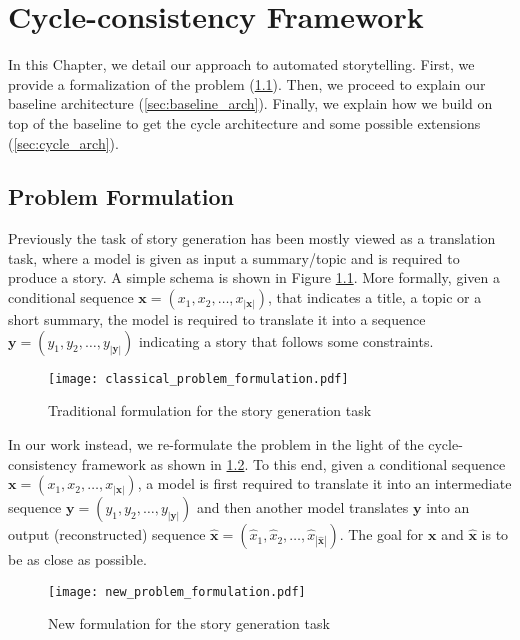 \chapter{Cycle-consistency Framework}
\label{ch:main_idea}


\graphicspath{ {./body/media/} }


In this Chapter, we detail our approach to automated storytelling. First, we provide a formalization of the problem (\cref{sec:formulation}). Then, we proceed to explain our baseline architecture (\cref{sec:baseline_arch}). Finally, we explain how we build on top of the baseline to get the cycle architecture and some possible extensions (\cref{sec:cycle_arch}).


\section{Problem Formulation}
\label{sec:formulation}

Previously the task of story generation has been mostly viewed as a translation task, where a model is given as input a summary/topic and is required to produce a story. A simple schema is shown in Figure \ref{fig:classical_problem_formulation}. More formally, given a conditional sequence $\mathbf{x} = (x_1, x_2, \ldots, x_{|\mathbf{x}|})$, that indicates a title, a topic or a short summary, the model is required to translate it into a sequence $\mathbf{y} = (y_1, y_2, \ldots, y_{|\mathbf{y}|})$ indicating a story that follows some constraints.

\begin{figure}[ht]
\centering
\texttt{[image: classical\_problem\_formulation.pdf]}
\caption{Traditional formulation for the story generation task}
\label{fig:classical_problem_formulation}
\end{figure}

In our work instead, we re-formulate the problem in the light of the cycle-consistency framework as shown in \cref{fig:new_problem_formulation}. To this end, given a conditional sequence $\mathbf{x} = (x_1, x_2, \ldots, x_{|\mathbf{x}|})$, a model is first required to translate it into an intermediate sequence $\mathbf{y} = (y_1, y_2, \ldots, y_{|\mathbf{y}|})$ and then another model translates $\mathbf{y}$ into an output (reconstructed) sequence $\hat{\mathbf{x}} = (\hat{x}_1, \hat{x}_2, \ldots, \hat{x}_{|\mathbf{\hat{\mathbf{x}}}|})$. The goal for $\mathbf{x}$ and $\hat{\mathbf{x}}$ is to be as close as possible.

\begin{figure}[ht]
\centering
\texttt{[image: new\_problem\_formulation.pdf]}
\caption{New formulation for the story generation task}
\label{fig:new_problem_formulation}
\end{figure}

